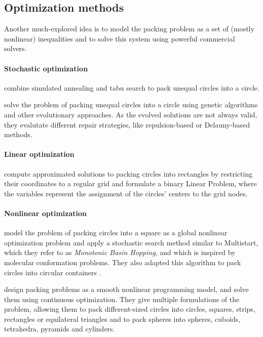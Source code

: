 \documentclass[a4paper,style=print,oneside,bibliography=totoc,nexus,lnum,extramargin]{tubsbook}
\begin{document}
\subsection{Optimization methods}

Another much-explored idea is to model the packing problem as a set of (mostly nonlinear) inequalities and to solve this system using powerful commercial solvers.

\paragraph{Stochastic optimization}

\textcite{ZD2005effective} combine simulated annealing and tabu search to pack unequal circles into a circle.

\textcite{FMC2015evolutionary} solve the problem of packing unequal circles into a circle using genetic algorithms and other evolutionary approaches. As the evolved solutions are not always valid, they evalutate different repair strategies, like repulsion-based or Delauny-based methods.

\paragraph{Linear optimization}

\textcite{LIE2014approximate} compute approximated solutions to packing circles into rectangles by restricting their coordinates to a regular grid and formulate a binary Linear Problem, where the variables represent the assignment of the circles' centers to the grid nodes.


\paragraph{Nonlinear optimization}

\textcite{ALS2008disk} model the problem of packing circles into a square as a global nonlinear optimization problem and apply a stochastic search method similar to Multistart, which they refer to as \emph{Monotonic Basin Hopping}, and which is inspired by molecular conformation problems. They also adapted this algorithm to pack circles into circular containers \cite{GJLS2009solving}.

\textcite{BS2008minimizing} design packing problems as a smooth nonlinear programming model, and solve them using continuous optimization. They give multiple formulations of the problem, allowing them to pack different-sized circles into circles, squares, strips, rectangles or equilateral triangles and to pack spheres into spheres, cuboids, tetrahedra, pyramids and cylinders.
\end{document}

